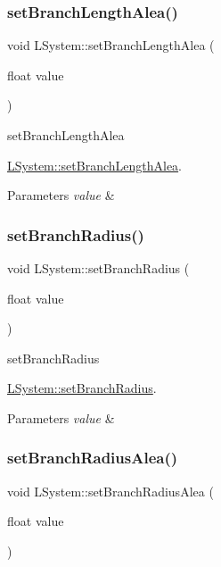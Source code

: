 \subsubsection{\texorpdfstring{set\+Branch\+Length\+Alea()}{setBranchLengthAlea()}}
{\footnotesize\ttfamily void L\+System\+::set\+Branch\+Length\+Alea (\begin{DoxyParamCaption}\item[{float}]{value }\end{DoxyParamCaption})}



set\+Branch\+Length\+Alea 

\hyperlink{classLSystem_ad09d0ac8d510a5aae1cc090a7b6c0266}{L\+System\+::set\+Branch\+Length\+Alea}.


\begin{DoxyParams}{Parameters}
{\em value} & \\
\hline
\end{DoxyParams}
\mbox{\label{classLSystem_a1c20e69f4d56292059fcb51409a7c1c1}} 
\subsubsection{\texorpdfstring{set\+Branch\+Radius()}{setBranchRadius()}}
{\footnotesize\ttfamily void L\+System\+::set\+Branch\+Radius (\begin{DoxyParamCaption}\item[{float}]{value }\end{DoxyParamCaption})}



set\+Branch\+Radius 

\hyperlink{classLSystem_a1c20e69f4d56292059fcb51409a7c1c1}{L\+System\+::set\+Branch\+Radius}.


\begin{DoxyParams}{Parameters}
{\em value} & \\
\hline
\end{DoxyParams}
\mbox{\label{classLSystem_ae33f0faa46188cde512df810889b0f21}} 
\subsubsection{\texorpdfstring{set\+Branch\+Radius\+Alea()}{setBranchRadiusAlea()}}
{\footnotesize\ttfamily void L\+System\+::set\+Branch\+Radius\+Alea (\begin{DoxyParamCaption}\item[{float}]{value }\end{DoxyParamCaption})}



